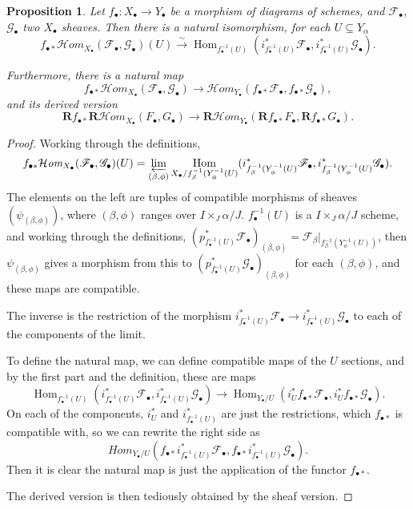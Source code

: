 \documentclass[proquest]{uwthesis}[2014/11/13]
\newtheorem{prop}[theorem]{Proposition}
\theoremstyle{definition}
\DeclareMathOperator{\Hom}{Hom}
\newcommand{\cHom}{\mathcal{H} \textit{om}}
\newcommand{\FF}{\mathscr{F}}
\newcommand{\GG}{\mathscr{G}}
\newcommand{\bR}{\textbf{R}}
\begin{document}
\begin{prop}
	\label{thm:chomnatmap}
	Let $f_\bullet : X_\bullet \rightarrow Y_\bullet$ be a morphism of diagrams of schemes, and $\FF_\bullet$, $\GG_\bullet$ two $X_\bullet$ sheaves.
	Then there is a natural isomorphism, for each $U \subseteq Y_\alpha$
	\[
	f_{\bullet *}  \cHom_{X_\bullet} (\FF_\bullet, \GG_\bullet) (U) \xrightarrow{\sim} \Hom_{f_\bullet^{-1}(U)} ( i_{f_\bullet^{-1}(U)}^* \FF_\bullet, i_{f_\bullet^{-1}(U)}^* \GG_\bullet).
	\]
	
	Furthermore, there is a natural map
	\[
	f_{\bullet *} \cHom_{X_\bullet} (\FF_\bullet , \GG_\bullet) \rightarrow \cHom_{Y_\bullet} (f_{\bullet *} \FF_\bullet, f_{\bullet *} \GG_\bullet),
	\]
	and its derived version
	\[
	\bR f_{\bullet *} \bR \cHom_{X_\bullet} (F_\bullet , G_\bullet) \rightarrow \bR \cHom_{Y_\bullet} (\bR f_{\bullet *} F_\bullet, \bR f_{\bullet *} G_\bullet).
	\]
\end{prop}
\begin{proof}
	Working through the definitions,
	\[
	f_{\bullet *}  \cHom_{X_\bullet} (\FF_\bullet, \GG_\bullet) (U) = \varprojlim_{(\beta, \phi)} \Hom_{X_\bullet / f_\beta^{-1}(Y_\phi^{-1}(U)} (i_{f_\beta^{-1}(Y_\phi^{-1}(U)}^* \FF_\bullet, i_{f_\beta^{-1}(Y_\phi^{-1}(U)}^* \GG_\bullet).
	\]
	The elements on the left are tuples of compatible morphisms of sheaves $(\psi_{(\beta, \phi)})$, where $(\beta, \phi)$ ranges over $I \times_J \alpha/J$.
	$f_\bullet^{-1}(U)$ is a $I \times_J \alpha/J$ scheme, and working through the definitions, $(p_{f_\bullet^{-1}(U)}^* \FF_\bullet)_{(\beta, \phi)} = \FF_\beta |_{f^{-1}_\beta(Y_\phi^{-1}(U))}$, then $\psi_{(\beta, \phi)}$ gives a morphism from this to $(p_{f_\bullet^{-1}(U)}^* \GG_\bullet)_{(\beta, \phi)}$ for each $(\beta, \phi)$, and these maps are compatible.
	
	The inverse is the restriction of the morphism $i_{f_\bullet^{-1}(U)}^* \FF_\bullet \rightarrow i_{f_\bullet^{-1}(U)}^* \GG_\bullet$ to each of the components of the limit.
	
	To define the natural map, we can define compatible maps of the $U$ sections, and by the first part and the definition, these are maps
	\[
	\Hom_{f_\bullet^{-1}(U)} ( i_{f_\bullet^{-1}(U)}^* \FF_\bullet, i_{f_\bullet^{-1}(U)}^* \GG_\bullet) \rightarrow \Hom_{Y_\bullet / U} (i_U^* f_{\bullet *} \FF_\bullet, i_U^* f_{\bullet *} \GG_\bullet).
	\] 
	On each of the components, $i_U^*$ and $i_{f_\bullet^{-1}(U)}^*$ are just the restrictions, which $f_{\bullet *}$ is compatible with, so we can rewrite the right side as
	\[
	Hom_{Y_\bullet / U} (f_{\bullet *} i_{f_\bullet^{-1}(U)}^*\FF_\bullet,  f_{\bullet *} i_{f_\bullet^{-1}(U)}^*\GG_\bullet).
	\]
	Then it is clear the natural map is just the application of the functor $f_{\bullet *}$.
	
	The derived version is then tediously obtained by the sheaf version.
\end{proof}
\end{document}
